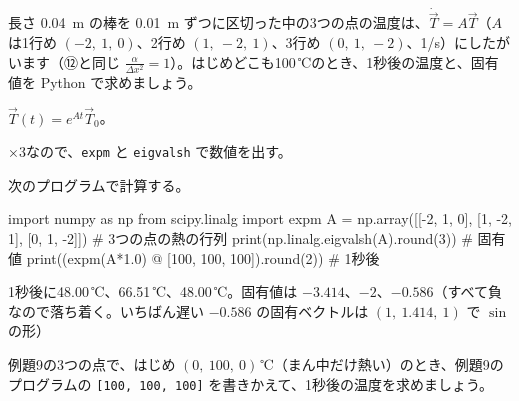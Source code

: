 \begin{reidai}[3つの点の熱]
長さ \qty{0.04}{m} の棒を \qty{0.01}{m} ずつに区切った中の3つの点の温度は、$\dot{\vec T}=A\vec T$（$A$ は1行め $(-2,\ 1,\ 0)$、2行め $(1,\ -2,\ 1)$、3行め $(0,\ 1,\ -2)$、1/s）にしたがいます（⑫と同じ $\frac{\alpha}{\Delta x^2}=1$）。はじめどこも100\,℃のとき、1秒後の温度と、固有値を Python で求めましょう。\par
\kangaekata {}\par
{}\enspace $\vec T(t)=e^{At}\vec T_0$。\par
{}×3なので、\texttt{expm} と \texttt{eigvalsh} で数値を出す。\par
\shiki 次のプログラムで計算する。\par
\begin{bkcode}[Python]
import numpy as np
from scipy.linalg import expm
A = np.array([[-2, 1, 0],
              [1, -2, 1],
              [0, 1, -2]])               \# 3つの点の熱の行列
print(np.linalg.eigvalsh(A).round(3))  \# 固有値
print((expm(A*1.0) @ [100, 100, 100]).round(2))  \# 1秒後
\end{bkcode}
\begin{bkcodeout}[実行結果]
[-3.414 -2.    -0.586]
[48.   66.51 48.  ]
\end{bkcodeout}
\kotae 1秒後に48.00\,℃、66.51\,℃、48.00\,℃。固有値は $-3.414$、$-2$、$-0.586$（すべて負なので落ち着く。いちばん遅い $-0.586$ の固有ベクトルは $(1,\ 1.414,\ 1)$ で $\sin$ の形）
\end{reidai}

\begin{jibun}
例題9の3つの点で、はじめ $(0,\ 100,\ 0)$\,℃（まん中だけ熱い）のとき、例題9のプログラムの \texttt{[100, 100, 100]} を書きかえて、1秒後の温度を求めましょう。
\end{jibun}

